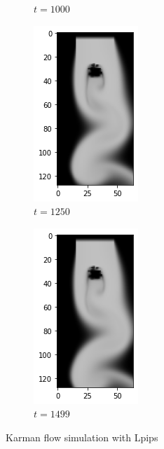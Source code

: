 \documentclass[a4paper,12pt,twoside]{report}
\begin{document}
\begin{figure}
\begin{subfigure}{0.18\textwidth}
		\caption{$t=1000$}
	\end{subfigure}
	\begin{subfigure}{0.18\textwidth}
		\centering
		\includegraphics[scale=0.5]{karmanflow/lpips_density_001250.png}
		\caption{$t=1250$}
	\end{subfigure}
	\begin{subfigure}{0.18\textwidth}
		\centering
		\includegraphics[scale=0.5]{karmanflow/lpips_density_001499.png}
		\caption{$t=1499$}
	\end{subfigure}
	\caption{Karman flow simulation with Lpips}
\end{figure}
\end{document}
